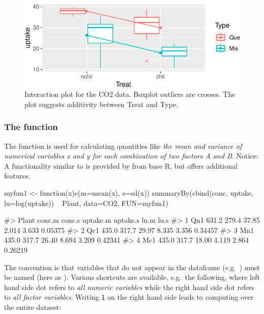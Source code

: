 \begin{Schunk}
\begin{figure}
\includegraphics[keepaspectratio]{doby-hojsgaard-fig-interaction-1} \caption[Interaction plot for the CO2 data]{Interaction plot for the CO2 data. Boxplot outliers are crosses. The plot suggests additivity between Treat and Type.}\label{fig:interaction}
\end{figure}
\end{Schunk}

\hypertarget{the-function}{%
\subsubsection{\texorpdfstring{The 
function}{The  function}}\label{the-function}}

The  function is used for calculating quantities like
\emph{the mean and variance of numerical variables x and y for each
combination of two factors A and B}. Notice: A functionality similar to
 is provided by  from base R, but
 offers additional features.

\begin{Schunk}
\begin{Sinput}
myfun1 <- function(x){c(m=mean(x), s=sd(x))}
summaryBy(cbind(conc, uptake, lu=log(uptake)) ~ Plant, data=CO2, FUN=myfun1)
\end{Sinput}
\begin{Soutput}
#>   Plant conc.m conc.s uptake.m uptake.s  lu.m    lu.s
#> 1   Qn1  631.2  279.4    37.85    2.014 3.633 0.05375
#> 2   Qc1  435.0  317.7    29.97    8.335 3.356 0.34457
#> 3   Mn1  435.0  317.7    26.40    8.694 3.209 0.42341
#> 4   Mc1  435.0  317.7    18.00    4.119 2.864 0.26219
\end{Soutput}
\end{Schunk}

The convention is that variables that do not appear in the dataframe
(e.g.~) must be named (here as ). Various
shortcuts are available, e.g.~the following, where left hand side dot
refers to \emph{all numeric variables} while the right hand side dot
refers to \emph{all factor variables}. Writing \texttt{1} on the right
hand side leads to computing over the entire dataset:

